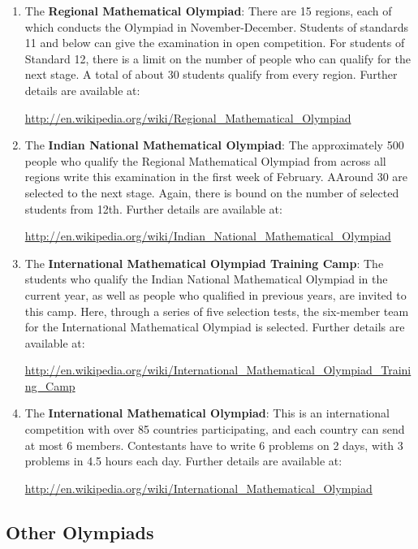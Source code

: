 \documentclass[a4paper]{amsart}
\begin{document}
\begin{enumerate}

\item The {\bf Regional Mathematical Olympiad}: There are 15 regions,
  each of which conducts the Olympiad in November-December. Students
  of standards 11 and below can give the examination in open
  competition.  For students of Standard 12, there is a limit on the
  number of people who can qualify for the next stage. A total of
  about 30 students qualify from every region. Further details are
  available at:

  \url{http://en.wikipedia.org/wiki/Regional_Mathematical_Olympiad}

\item The {\bf Indian National Mathematical Olympiad}: The
  approximately 500 people who qualify the Regional Mathematical
  Olympiad from across all regions write this examination in the first
  week of February. AAround 30 are selected to the next stage. Again,
  there is bound on the number of selected students from 12th.
  Further details are available at:
  
  \url{http://en.wikipedia.org/wiki/Indian_National_Mathematical_Olympiad}

\item The {\bf International Mathematical Olympiad Training Camp}: The
  students who qualify the Indian National Mathematical Olympiad in
  the current year, as well as people who qualified in previous years,
  are invited to this camp. Here, through a series of five selection
  tests, the six-member team for the International Mathematical Olympiad is
  selected.  Further details are available at:
  
  \url{http://en.wikipedia.org/wiki/International_Mathematical_Olympiad_Training_Camp}

\item The {\bf International Mathematical Olympiad}: This is an
  international competition with over 85 countries participating, and
  each country can send at most 6 members. Contestants have to write 6
  problems on 2 days, with 3 problems in 4.5 hours each day. Further
  details are available at:
  
   \url{http://en.wikipedia.org/wiki/International_Mathematical_Olympiad}
\end{enumerate}

\subsection{Other Olympiads}
\end{document}
